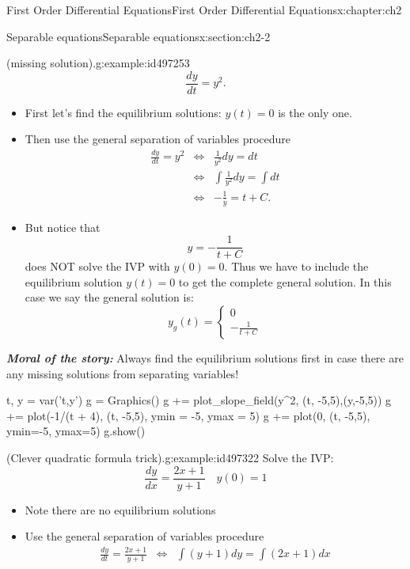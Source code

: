 \documentclass[oneside,10pt,]{book}
\newcommand{\alert}[1]{\textbf{\textit{#1}}}
\numberwithin{equation}{section}
\numberwithin{equation}{section}
\newcommand{\amp}{&}
\begin{document}
\begin{chapterptx}{First Order Differential Equations}{}{First Order Differential Equations}{}{}{x:chapter:ch2}
\begin{sectionptx}{Separable equations}{}{Separable equations}{}{}{x:section:ch2-2}
\begin{example}{(missing solution).}{g:example:id497253}
\begin{equation*}
\frac{dy}{dt}=y^{2}.
\end{equation*}
%
%
\begin{itemize}[label=\textbullet]
\item{}First let's find the equilibrium solutions: \(y(t)=0\) is the only one.%
\item{}Then use the general separation of variables procedure%
\begin{align*}
\frac{dy}{dt}=y^{2} \amp \iff \amp \frac{1}{y^{2}}dy=dt\\
\amp \iff \amp \int\frac{1}{y^{2}}dy=\int dt\\
\amp \iff \amp -\frac{1}{y}=t+C.
\end{align*}
%
\item{}But notice that%
\begin{equation*}
y=-\frac{1}{t+C}
\end{equation*}
does NOT solve the IVP with \(y(0)=0\). Thus we have to include the equilibrium solution \(y(t)=0\) to get the complete general solution. In this case we say the general solution is:%
\begin{equation*}
y_g(t) = \begin{cases}
0\\
-\frac{1}{t + C}
\end{cases}
\end{equation*}
%
\end{itemize}
\alert{Moral of the story:} Always find the equilibrium solutions first in case there are any missing solutions from separating variables!%
\begin{sageinput}
t, y = var('t,y')
g = Graphics()
g += plot_slope_field(y^2, (t, -5,5),(y,-5,5))
g += plot(-1/(t + 4), (t, -5,5), ymin = -5, ymax = 5)
g += plot(0, (t, -5,5), ymin=-5, ymax=5)
g.show()
\end{sageinput}
\end{example}
\begin{example}{(Clever quadratic formula trick).}{g:example:id497322}%
Solve the IVP:%
\begin{equation*}
\frac{dy}{dx}=\frac{2x+1}{y+1}\,\,\,\,\,\,y(0)=1
\end{equation*}
%
%
\begin{itemize}[label=\textbullet]
\item{}Note there are no equilibrium solutions%
\item{}Use the general separation of variables procedure%
\begin{align*}
\frac{dy}{dt}=\frac{2x+1}{y+1} \amp \iff \amp \int\left(y+1\right)dy=\int\left(2x+1\right)dx\\

\end{align*}
\end{itemize}
\end{example}
\end{sectionptx}
\end{chapterptx}
\end{document}
